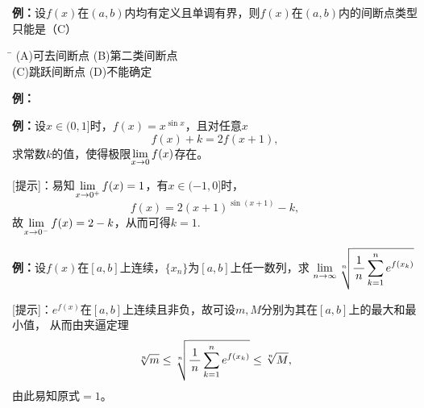 
{\bf 例：}设$f(x)$在$(a,b)$内均有定义且单调有界，则$f(x)$在$(a,b)$内的间断点类型只能是（C）
\begin{tabbing}
	\hspace{8cm}\=\kill
	\quad\quad\quad
	(A)\;可去间断点 \> 
	(B)\;第二类间断点 \\ 
	\quad\quad\quad
	(C)\;跳跃间断点\>
	(D)\;不能确定
\end{tabbing}



{\bf 例：}



{\bf 例：}设$x\in(0,1]$时，$f(x)=x^{\sin x}$，且对任意$x$
$$f(x)+k=2f(x+1),$$
求常数$k$的值，使得极限$\lim\limits_{x\to{0}}f(x)$存在。

[提示]：易知$\lim\limits_{x\to{0^+}}f(x)=1$，有$x\in(-1,0]$时，
$$f(x)=2(x+1)^{\sin(x+1)}-k,$$
故$\lim\limits_{x\to{0^-}}f(x)=2-k$，从而可得$k=1$.

{\bf 例：}设$f(x)$在$[a,b]$上连续，$\{x_n\}$为$[a,b]$上任一数列，求
$\lim\limits_{n\to\infty}\sqrt[n]{\displaystyle\frac{\,{1}\,}{\,{n}\,}\sum\limits_{k=1}^ne^{f(x_k)}}$

[提示]：$e^{f(x)}$在$[a,b]$上连续且非负，故可设$m,M$分别为其在$[a,b]$上的最大和最小值，
从而由夹逼定理
$$\sqrt[n]m\leq\sqrt[n]{\displaystyle\frac{\,{1}\,}{\,{n}\,}\sum\limits_{k=1}^ne^{f(x_k)}}\leq\sqrt[n]M,$$
由此易知原式$=1$。

